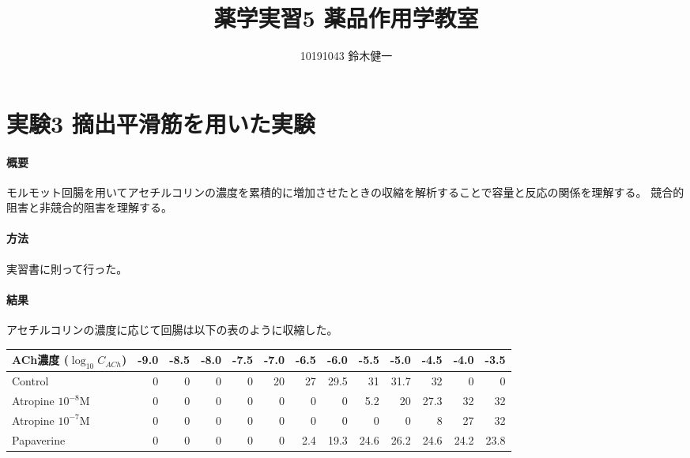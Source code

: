 \documentclass[a4paper,papersize,dvipdfmx]{jsarticle}
\begin{document}
\title{薬学実習5 薬品作用学教室}
\author{10191043 鈴木健一}
\date{}
\maketitle



\part*{実験3 摘出平滑筋を用いた実験}


\subsection*{概要}
モルモット回腸を用いてアセチルコリンの濃度を累積的に増加させたときの収縮を解析することで容量と反応の関係を理解する。
競合的阻害と非競合的阻害を理解する。

\subsection*{方法}
実習書に則って行った。

\subsection*{結果}
アセチルコリンの濃度に応じて回腸は以下の表のように収縮した。

\begin{table}[H]
\centering
\begin{tabular}{@{}lrrrrrrrrrrrr@{}}
\toprule
ACh濃度 ($\log_{10} {C_{ACh}}$)  & -9.0 & -8.5 & -8.0 & -7.5 & -7.0 & -6.5 & -6.0   & -5.5 & -5.0   & -4.5 & -4.0   & -3.5 \\ \midrule
Control     & 0  & 0    & 0  & 0    & 20 & 27   & 29.5 & 31   & 31.7 & 32   & 0    & 0    \\
Atropine $10^{-8}$M & 0  & 0    & 0  & 0    & 0  & 0    & 0    & 5.2  & 20   & 27.3 & 32   & 32   \\
Atropine $10^{-7}$M & 0  & 0    & 0  & 0    & 0  & 0    & 0    & 0    & 0    & 8    & 27   & 32   \\
Papaverine  & 0  & 0    & 0  & 0    & 0  & 2.4  & 19.3 & 24.6 & 26.2 & 24.6 & 24.2 & 23.8 \\ \bottomrule
\end{tabular}
\end{table}
\end{document}
